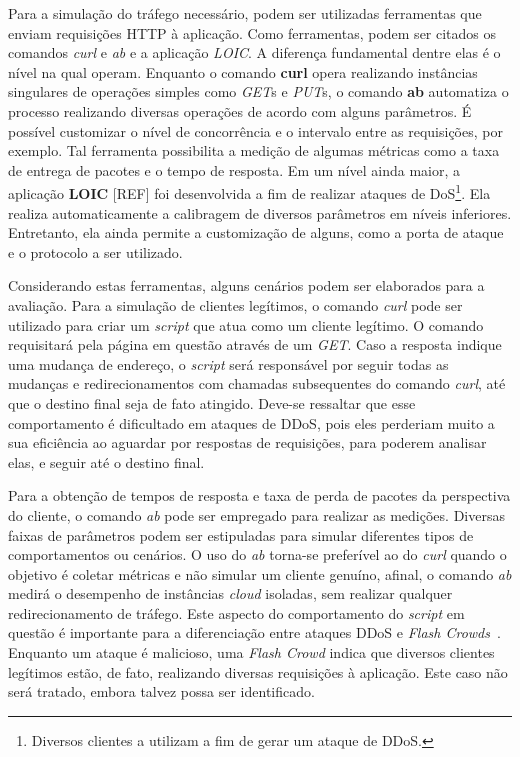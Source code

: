 
Para a simulação do tráfego necessário, podem ser utilizadas ferramentas que enviam requisições HTTP à aplicação. Como ferramentas, podem ser citados os comandos \emph{curl} e \emph{ab} e a aplicação \emph{LOIC}. A diferença fundamental dentre elas é o nível na qual operam. Enquanto o comando \textbf{curl} opera realizando instâncias singulares de operações simples como \emph{GET}s e \emph{PUT}s, o comando \textbf{ab} automatiza o processo realizando diversas operações de acordo com alguns parâmetros. É possível customizar o nível de concorrência e o intervalo entre as requisições, por exemplo. Tal ferramenta possibilita a medição de algumas métricas como a taxa de entrega de pacotes e o tempo de resposta. Em um nível ainda maior, a aplicação \textbf{LOIC} [REF] foi desenvolvida a fim de realizar ataques de DoS\footnote{Diversos clientes a utilizam a fim de gerar um ataque de DDoS.}. Ela realiza automaticamente a calibragem de diversos parâmetros em níveis inferiores. Entretanto, ela ainda permite a customização de alguns, como a porta de ataque e o protocolo a ser utilizado.

Considerando estas ferramentas, alguns cenários podem ser elaborados para a avaliação. 
%
Para a simulação de clientes legítimos, o comando \emph{curl} pode ser utilizado para criar um \emph{script} que atua como um cliente legítimo. O comando requisitará pela página em questão através de um \emph{GET}. Caso a resposta indique uma mudança de endereço, o \emph{script} será responsável por seguir todas as mudanças e redirecionamentos com chamadas subsequentes do comando \emph{curl}, até que o destino final seja de fato atingido. Deve-se ressaltar que esse comportamento é dificultado em ataques de DDoS, pois eles perderiam muito a sua eficiência ao aguardar por respostas de requisições, para poderem analisar elas, e seguir até o destino final.

Para a obtenção de tempos de resposta e taxa de perda de pacotes da perspectiva do cliente, o comando \emph{ab} pode ser empregado para realizar as medições. Diversas faixas de parâmetros podem ser estipuladas para simular diferentes tipos de comportamentos ou cenários. O uso do \emph{ab} torna-se preferível ao do \emph{curl} quando o objetivo é coletar métricas e não simular um cliente genuíno, afinal, o comando \emph{ab} medirá o desempenho de instâncias \emph{cloud} isoladas, sem realizar qualquer redirecionamento de tráfego. Este aspecto do comportamento do \emph{script} em questão é importante para a diferenciação entre ataques DDoS e \emph{Flash Crowds}~\cite{Thapngam:2011p27061}. Enquanto um ataque é malicioso, uma \emph{Flash Crowd} indica que diversos clientes legítimos estão, de fato, realizando diversas requisições à aplicação. Este caso não será tratado, embora talvez possa ser identificado.

